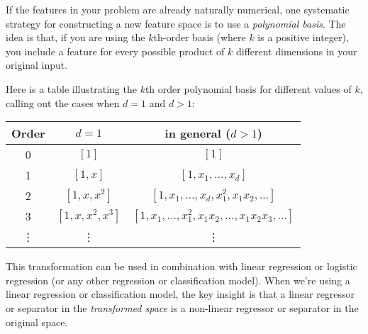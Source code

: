 \label{polyBasis}

If the features in your problem are already naturally numerical, one
systematic strategy for constructing a new feature space is to use a
{\em polynomial basis}.  The idea is that, if you are using the
$k$th-order basis (where $k$ is a positive integer), you include a
feature for every possible product of $k$ different dimensions in your
original input.  

Here is a table illustrating the $k$th order polynomial basis for
different values of $k$, calling out the cases when $d=1$ and $d>1$:

\begin{center}
\begin{tabular}{c c c}
Order & $d=1$ & in general ($d>1$) \\
\hline
0 & $[1]$ & $[1]$\\
1 & $[1,x]$ & $[1,x_1, \ldots, x_d]$\\
2 & $[1,x,x^2]$ & $[1,x_1, \ldots, x_d,
                    x_1^2, x_1x_2, \ldots]$\\
3 & $[1,x,x^2,x^3]$ & $[1,x_1, \ldots,
                    x_1^2, x_1x_2, \ldots,
                    x_1x_2x_3, \ldots]$ \\
\vdots & \vdots & \vdots
\end{tabular}
\end{center}

This transformation can be used in combination with linear regression
or logistic regression (or any other regression or classification
model).  When we're using a linear regression or classification model,
the key insight is that a linear regressor or separator in the {\em
  transformed space} is a non-linear regressor or separator in the
original space.


% 
% 
% 
 
